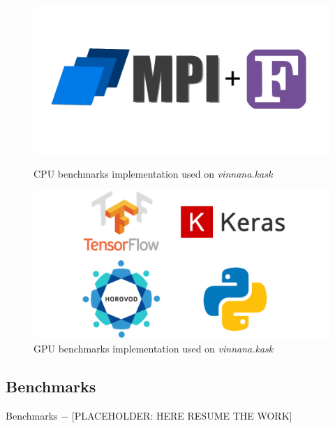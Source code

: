 \begin{figure}[hbt!]
    \centering
    \captionsetup{width=.46\linewidth}
    \begin{minipage}[t]{0.46\textwidth}
        \includegraphics[width=\textwidth]{figures/implementations/MPI-Fortran_logo.png}
        \caption{CPU benchmarks implementation used on \emph{vinnana.kask}}\label{fig:cpus_implementation_vinnana.kask}
    \end{minipage}
    \hspace{1cm}
    \centering
    \captionsetup{width=.46\linewidth}
    \begin{minipage}[t]{0.46\textwidth}
        \includegraphics[width=\textwidth]{figures/implementations/Horovod-Python_logo.png}
        \caption{GPU benchmarks implementation used on \emph{vinnana.kask}}\label{fig:gpus_implementation_vinnana.kask}
    \end{minipage}
\end{figure}



\newpage

\subsection{Benchmarks}
Benchmarks $-$ [PLACEHOLDER: HERE RESUME THE WORK]

